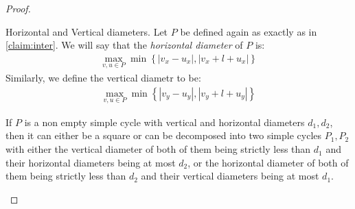 \begin{proof}
\begin{figure}[h]
\begin{tikzpicture}
  \end{tikzpicture}
\end{figure}

  \begin{definition}
    Horizontal and Vertical diameters. Let $P$ be defined again as exactly as in \cref{claim:inter}. We will say that the \textit{horizontal diameter} of $P$ is: 
    \begin{equation*}
      \begin{split}
        \max_{v,u\in P} \min{ \left\{  | v_{x} -u_{x}|, |v_{x} + l + u_{x}| \right\} }  
      \end{split}
    \end{equation*}
    Similarly, we define the vertical diametr to be: 
    \begin{equation*}
      \begin{split}
        \max_{v,u\in P} \min{ \left\{  | v_{y} -u_{y}|, |v_{y} + l + u_{y}| \right\} }  
      \end{split}
    \end{equation*}
  \end{definition}

  \begin{claim} \label{claim:reduce}
If $P$ is a non empty simple cycle with vertical and horizontal diameters $d_{1}, d_{2}$, then it can either be a square or can be decomposed into two simple cycles $P_{1},P_{2}$ with either the vertical diameter of both of them being strictly less than $d_{1}$ and their horizontal diameters being at most $d_{2}$, or the horizontal diameter of both of them being strictly less than $d_{2}$ and their vertical diameters being at most $d_{1}$.
  \end{claim}


\end{proof}
